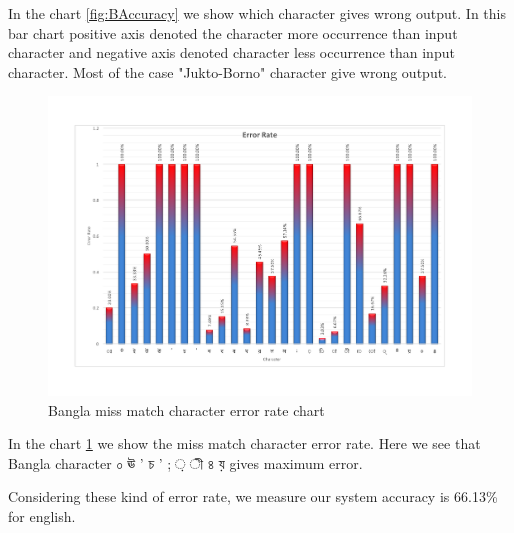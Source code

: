 In the chart \ref{fig:BAccuracy} we show which character gives wrong output. In this bar chart positive axis denoted the character more occurrence than input character and negative axis denoted character less occurrence than input character. Most of the case "Jukto-Borno" character give wrong output.

\begin{figure}[H]
\centering
\includegraphics[width=1\textwidth]{BError.pdf}
\caption {Bangla miss match character error rate chart}
\label {fig:BEerror}
\end{figure}

In the chart \ref{fig:BEerror} we show the miss match character error rate. Here we see that Bangla character {\bengalifont ০ ঊ ’ চ ' ; ় ী ৪ য়} gives maximum error.

Considering these kind of error rate, we measure our system accuracy is 66.13\% for english.